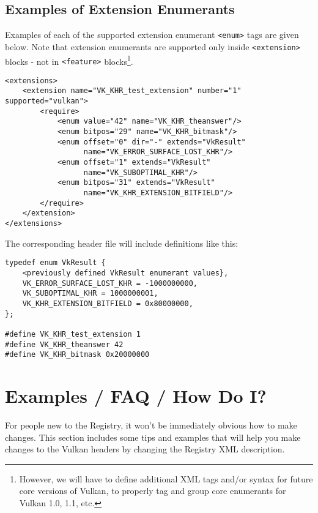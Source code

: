 \documentclass{article}
\def\tag#1{{\tt <#1>\index{<#1>}}}
\begin{document}
\subsection{Examples of Extension Enumerants}
\label{tag:required:examples}

Examples of each of the supported extension enumerant \tag{enum} tags are
given below. Note that extension enumerants are supported only inside
\tag{extension} blocks - not in \tag{feature} blocks\footnote{
    However, we will have to define additional XML tags and/or syntax for
    future core versions of Vulkan, to properly tag and group core
    enumerants for Vulkan 1.0, 1.1, etc.}.

\begin{verbatim}
<extensions>
    <extension name="VK_KHR_test_extension" number="1" supported="vulkan">
        <require>
            <enum value="42" name="VK_KHR_theanswer"/>
            <enum bitpos="29" name="VK_KHR_bitmask"/>
            <enum offset="0" dir="-" extends="VkResult"
                  name="VK_ERROR_SURFACE_LOST_KHR"/>
            <enum offset="1" extends="VkResult"
                  name="VK_SUBOPTIMAL_KHR"/>
            <enum bitpos="31" extends="VkResult"
                  name="VK_KHR_EXTENSION_BITFIELD"/>
        </require>
    </extension>
</extensions>
\end{verbatim}

The corresponding header file will include definitions like this:

\begin{verbatim}
typedef enum VkResult {
    <previously defined VkResult enumerant values},
    VK_ERROR_SURFACE_LOST_KHR = -1000000000,
    VK_SUBOPTIMAL_KHR = 1000000001,
    VK_KHR_EXTENSION_BITFIELD = 0x80000000,
};

#define VK_KHR_test_extension 1
#define VK_KHR_theanswer 42
#define VK_KHR_bitmask 0x20000000
\end{verbatim}

\clearpage
\appendix

\section{Examples / FAQ / How Do I?}
\label{examples}

For people new to the Registry, it won't be immediately obvious how to make
changes. This section includes some tips and examples that will help you
make changes to the Vulkan headers by changing the Registry XML description.
\end{document}
